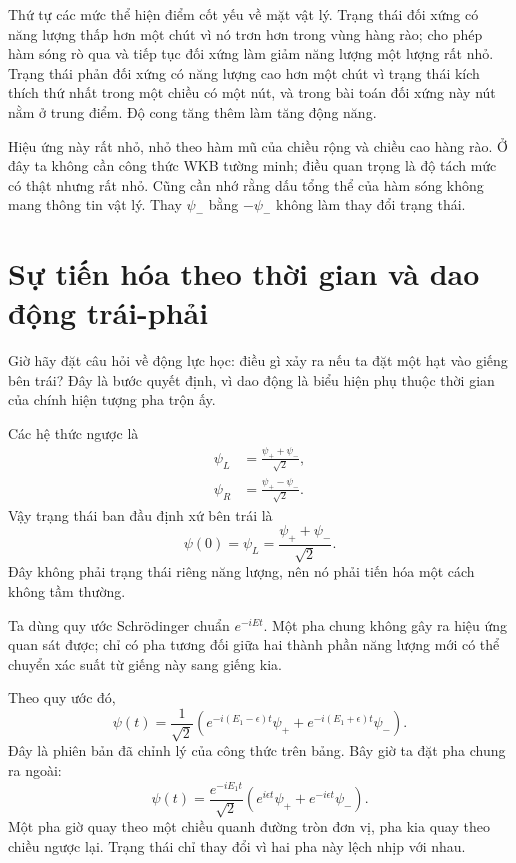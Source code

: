 Thứ tự các mức thể hiện điểm cốt yếu về mặt vật lý. Trạng thái đối xứng có năng lượng thấp hơn một chút vì nó trơn hơn trong vùng hàng rào; cho phép hàm sóng rò qua và tiếp tục đối xứng làm giảm năng lượng một lượng rất nhỏ. Trạng thái phản đối xứng có năng lượng cao hơn một chút vì trạng thái kích thích thứ nhất trong một chiều có một nút, và trong bài toán đối xứng này nút nằm ở trung điểm. Độ cong tăng thêm làm tăng động năng.

Hiệu ứng này rất nhỏ, nhỏ theo hàm mũ của chiều rộng và chiều cao hàng rào. Ở đây ta không cần công thức WKB tường minh; điều quan trọng là độ tách mức có thật nhưng rất nhỏ. Cũng cần nhớ rằng dấu tổng thể của hàm sóng không mang thông tin vật lý. Thay \(\psi_-\) bằng \(-\psi_-\) không làm thay đổi trạng thái.

\section{Sự tiến hóa theo thời gian và dao động trái-phải}

Giờ hãy đặt câu hỏi về động lực học: điều gì xảy ra nếu ta đặt một hạt vào giếng bên trái? Đây là bước quyết định, vì dao động là biểu hiện phụ thuộc thời gian của chính hiện tượng pha trộn ấy.

Các hệ thức ngược là
\begin{align}
\psi_L &= \frac{\psi_+ + \psi_-}{\sqrt{2}},\\
\psi_R &= \frac{\psi_+ - \psi_-}{\sqrt{2}}.
\end{align}
Vậy trạng thái ban đầu định xứ bên trái là
\begin{equation}
\psi(0)=\psi_L=\frac{\psi_+ + \psi_-}{\sqrt{2}}.
\end{equation}
Đây không phải trạng thái riêng năng lượng, nên nó phải tiến hóa một cách không tầm thường.

Ta dùng quy ước Schr\"odinger chuẩn \(e^{-iEt}\). Một pha chung không gây ra hiệu ứng quan sát được; chỉ có pha tương đối giữa hai thành phần năng lượng mới có thể chuyển xác suất từ giếng này sang giếng kia.

Theo quy ước đó,
\begin{equation}
\psi(t)=\frac{1}{\sqrt{2}}\left(e^{-i(E_1-\epsilon)t}\psi_+ + e^{-i(E_1+\epsilon)t}\psi_-\right).
\end{equation}
Đây là phiên bản đã chỉnh lý của công thức trên bảng. Bây giờ ta đặt pha chung ra ngoài:
\begin{equation}
\psi(t)=\frac{e^{-iE_1 t}}{\sqrt{2}}\left(e^{i\epsilon t}\psi_+ + e^{-i\epsilon t}\psi_-\right).
\end{equation}
Một pha giờ quay theo một chiều quanh đường tròn đơn vị, pha kia quay theo chiều ngược lại. Trạng thái chỉ thay đổi vì hai pha này lệch nhịp với nhau.

